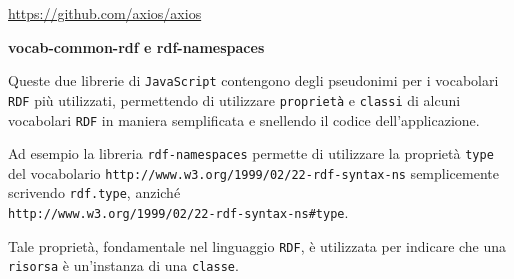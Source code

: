 \smallskip

\href{https://github.com/axios/axios}{https://github.com/axios/axios}

\bigskip

\textbf{vocab-common-rdf e rdf-namespaces}

\bigskip

Queste due librerie di {\tt JavaScript} contengono degli pseudonimi per i vocabolari {\tt RDF} più utilizzati, permettendo di utilizzare {\tt proprietà} e {\tt classi} di alcuni vocabolari {\tt RDF} in maniera semplificata e snellendo il codice dell'applicazione.

\medskip

Ad esempio la libreria {\tt rdf-namespaces} permette di utilizzare la proprietà {\tt type} del vocabolario {\tt http://www.w3.org/1999/02/22-rdf-syntax-ns} semplicemente scrivendo {\tt rdf.type}, anziché\\{\tt http://www.w3.org/1999/02/22-rdf-syntax-ns\#type}.

\medskip

Tale proprietà, fondamentale nel linguaggio {\tt RDF}, è utilizzata per indicare che una {\tt risorsa} è un'instanza di una {\tt classe}.

\clearpage